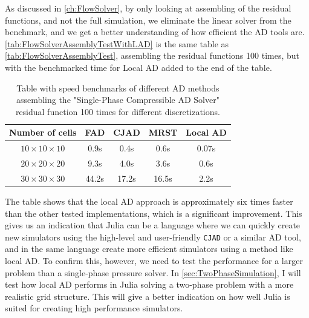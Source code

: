 As discussed in \autoref{ch:FlowSolver}, by only looking at assembling of the residual functions, and not the full simulation, we eliminate the linear solver from the benchmark, and we get a better understanding of how efficient the AD tools are. \autoref{tab:FlowSolverAssemblyTestWithLAD} is the same table as \autoref{tab:FlowSolverAssemblyTest}, assembling the residual functions 100 times, but with the benchmarked time for Local AD added to the end of the table.
\begin{table}[htb]
    \centering
    \caption{Table with speed benchmarks of different AD methods assembling the "Single-Phase Compressible AD Solver" residual function 100 times for different discretizations.}
    \label{tab:FlowSolverAssemblyTestWithLAD}
    \def\arraystretch{1.5}
    \begin{tabular}{ccccc}
    \textbf{Number of cells} & \textbf{FAD} & \textbf{CJAD} & \textbf{MRST} & \textbf{Local AD}\\
        \hline
         $10\times10\times10$ & 0.9s & 0.4s & 0.6s & 0.07s \\  
         $20\times20\times20$ & 9.3s & 4.0s & 3.6s & 0.6s \\ 
         $30\times30\times30$ & 44.2s& 17.2s& 16.5s & 2.2s \\ \hline
    \end{tabular}
\end{table}
The table shows that the local AD approach is approximately six times faster than the other tested implementations, which is a significant improvement. This gives us an indication that Julia can be a language where we can quickly create new simulators using the high-level and user-friendly \texttt{CJAD} or a similar AD tool, and in the same language create more efficient simulators using a method like local AD. To confirm this, however, we need to test the performance for a larger problem than a single-phase pressure solver. In \autoref{sec:TwoPhaseSimulation}, I will test how local AD performs in Julia solving a two-phase problem with a more realistic grid structure. This will give a better indication on how well Julia is suited for creating high performance simulators.

